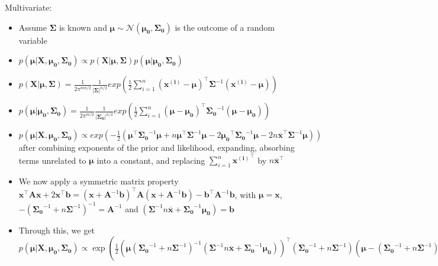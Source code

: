 Multivariate:
\begin{itemize}
    \item Assume $\boldsymbol{\Sigma}$ is known and $\boldsymbol{\mu} \sim \mathcal{N}(\boldsymbol{\mu_0}, \boldsymbol{\Sigma_0})$ is the outcome of a random variable
    \item $p(\boldsymbol{\mu} | \boldsymbol{X}, \boldsymbol{\mu_0}, \boldsymbol{\Sigma_0}) \propto p(\boldsymbol{X} | \boldsymbol{\mu}, \boldsymbol{\Sigma})p(\boldsymbol{\mu} | \boldsymbol{\mu_0}, \boldsymbol{\Sigma_0})$
    \item $p(\boldsymbol{X} | \boldsymbol{\mu}, \boldsymbol{\Sigma}) = \frac{1}{2\pi^{mn/2}} \frac{1}{|\boldsymbol{\Sigma}|^{n/2}} exp(\frac{1}{2} \sum_{i=1}^n ( \boldsymbol{\boldsymbol{x^{(i)}}} - \boldsymbol{\mu} )^\intercal \boldsymbol{\Sigma}^{-1} ( \boldsymbol{\boldsymbol{x^{(i)}}} - \boldsymbol{\mu} ) )$
    \item $p(\boldsymbol{\mu} | \boldsymbol{\mu_0}, \boldsymbol{\Sigma_0}) = \frac{1}{2\pi^{m/2}} \frac{1}{|\boldsymbol{\Sigma_0}|^{n/2}} exp(\frac{1}{2} \sum_{i=1}^n ( \boldsymbol{\mu} - \boldsymbol{\mu_0} )^\intercal \boldsymbol{\Sigma_0}^{-1} ( \boldsymbol{\mu} - \boldsymbol{\mu_0} ) )$
    \item $p(\boldsymbol{\mu} | \boldsymbol{X}, \boldsymbol{\mu_0}, \boldsymbol{\Sigma_0}) \propto exp( -\frac{1}{2} ( \boldsymbol{\mu}^\intercal \boldsymbol{\Sigma_0}^{-1} \boldsymbol{\mu} + n \boldsymbol{\mu}^\intercal \boldsymbol{\Sigma}^{-1} \boldsymbol{\mu} - 2 \boldsymbol{\mu_0}^\intercal \boldsymbol{\Sigma_0}^{-1} \boldsymbol{\mu} - 2 n \overline{\boldsymbol{x}}^\intercal \boldsymbol{\Sigma}^{-1} \boldsymbol{\mu} ) )$ after combining exponents of the prior and likelihood, expanding, absorbing terms unrelated to $\boldsymbol{\mu}$ into a constant, and replacing $\sum_{i=1}^n {\boldsymbol{x^{(i)}}}^\intercal$ by $n \overline{\boldsymbol{x}}^\intercal$
    \item We now apply a symmetric matrix property $\boldsymbol{x}^\intercal \boldsymbol{A} \boldsymbol{x} + 2 \boldsymbol{x}^\intercal \boldsymbol{b} = ( \boldsymbol{x} + \boldsymbol{A}^{-1} \boldsymbol{b} )^\intercal \boldsymbol{A} ( \boldsymbol{x} + \boldsymbol{A}^{-1} \boldsymbol{b} ) - \boldsymbol{b}^\intercal \boldsymbol{A}^{-1} \boldsymbol{b}$, with $\boldsymbol{\mu} = \boldsymbol{x}$, $-( \boldsymbol{\Sigma_0}^{-1} + n \boldsymbol{\Sigma}^{-1} )^{-1} = \boldsymbol{A}^{-1}$ and $(\boldsymbol{\Sigma}^{-1} n \overline{\boldsymbol{x}} + \boldsymbol{\Sigma_0}^{-1} \boldsymbol{\mu_0}) = \boldsymbol{b}$
    \item Through this, we get $p(\boldsymbol{\mu} | \boldsymbol{X}, \boldsymbol{\mu_0}, \boldsymbol{\Sigma_0}) \propto \exp (  \frac{1}{2}  ( \boldsymbol{\mu} (  \boldsymbol{\Sigma_0}^{-1} + n \boldsymbol{\Sigma}^{-1} )^{-1} ( \boldsymbol{\Sigma}^{-1} n \overline{\boldsymbol{x}} + \boldsymbol{\Sigma_0}^{-1} \boldsymbol{\mu_0} ) )^\intercal ( \boldsymbol{\Sigma_0}^{-1} + n \boldsymbol{\Sigma}^{-1} ) ( \boldsymbol{\mu} - ( \boldsymbol{\Sigma_0}^{-1} + n \boldsymbol{\Sigma}^{-1} )^{-1} ( \boldsymbol{\Sigma}^{-1} n \overline{\boldsymbol{x}} + \boldsymbol{\Sigma_0}^{-1} \boldsymbol{\mu_0} ) ) ) = exp( \frac{1}{2} ( \boldsymbol{\mu} - \boldsymbol{\mu}_n )^\intercal  \boldsymbol{\Sigma}_n^{-1} ( \boldsymbol{\mu} - \boldsymbol{\mu}_n ) )$

\end{itemize}
